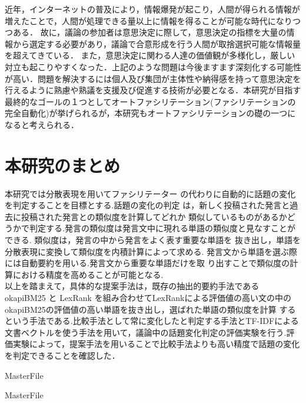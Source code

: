 近年，インターネットの普及により，情報爆発が起こり，人間が得られる情報が増えたことで，人間が処理できる量以上に情報を得ることが可能な時代になりつつある．
故に，議論の参加者は意思決定に際して，意思決定の指標を大量の情報から選定する必要があり，議論で合意形成を行う人間が取捨選択可能な情報量を超えてきている．
また，意思決定に関わる人達の価値観が多様化し，厳しい対立も起こりやすくなった．上記のような問題は今後ますます深刻化する可能性が高い．問題を解決するには個人及び集団が主体性や納得感を持って意思決定を行えるように熟慮や熟議を支援及び促進する技術が必要となる．本研究が目指す最終的なゴールの１つとしてオートファシリテーション(ファシリテーションの完全自動化)が挙げられるが，本研究もオートファシリテーションの礎の一つになると考えられる．

\section{本研究のまとめ}
\label{con:conclusion}
本研究では分散表現を用いてファシリテーター の代わりに自動的に話題の変化を判定することを目標とする.話題の変化の判定 は，新しく投稿された発言と過去に投稿された発言との類似度を計算してどれか 類似しているものがあるかどうかで判定する.発言の類似度は発言文中に現れる単語の類似度と見なすことができる.
類似度は，発言の中から発言をよく表す重要な単語を 抜き出し，単語を分散表現に変換して類似度を内積計算によって求める.
 発言文から単語を選ぶ際には自動要約を用いる.発言文から重要な単語だけを取 り出すことで類似度の計算における精度を高めることが可能となる.\\
以上を踏まえて，具体的な提案手法は，既存の抽出的要約手法である okapiBM25 と LexRank を組み合わせてLexRankによる評価値の高い文の中のokapiBM25の評価値の高い単語を抜き出し，選ばれた単語の類似度を計算 するという手法である.比較手法として常に変化したと判定する手法とTF-IDFによる文書ベクトルを使う手法を用いて，議論中の話題変化判定の評価実験を行う.評価実験によって，提案手法を用いることで比較手法よりも高い精度で話題の変化を判定できることを確認した．

 \expandafter\ifx\csname MasterFile\endcsname\relax
	\def\BibFile{hoge}
	
  \fi
  \expandafter\ifx\csname MasterFile\endcsname\relax

\fi
